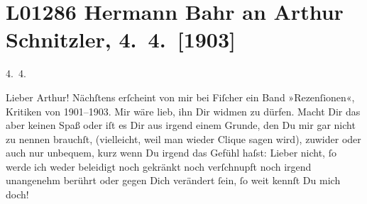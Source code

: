 

\section[Hermann Bahr an Arthur Schnitzler, 4. 4. {[}1903{]}]{L01286 Hermann Bahr an Arthur Schnitzler, 4. 4. {[}1903{]}}
\nopagebreak{}
\rehead{ }\normalsize\beginnumbering{}
\toendnotes[C]{\smallbreak\pagebreak[2]}
\toendnotes[C]{\smallbreak}
\pstart
           \raggedleft{}{\pb}4. 4.\pend
           
\pstart\center{}Lieber Arthur!\pend\vspace{0.5em}
\pstart
           Nächſtens erſcheint von mir bei Fiſcher ein
               Band »Rezenſionen«, Kritiken von 1901–1903. Mir
               wäre lieb, ihn Dir widmen zu dürfen. Macht Dir das aber keinen Spaß oder iſt es Dir
               aus irgend einem Grunde, den Du mir gar nicht zu nennen brauchſt, (vielleicht, weil
               man wieder Clique sagen wird), zuwider oder auch nur unbequem, kurz wenn Du irgend
               das Gefühl haſst: Lieber nicht, ſo werde ich weder beleidigt noch gekränkt noch
               verſchnupft noch irgend unangenehm berührt oder gegen Dich verändert ſein, ſo weit
               kennſt Du mich doch!{\pb}\pend
           
